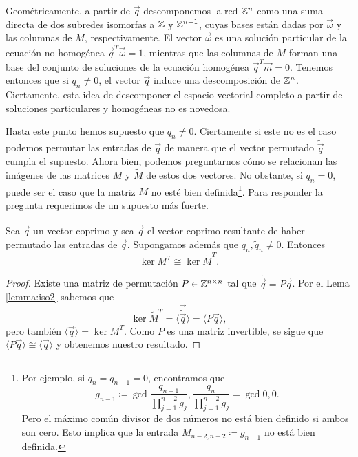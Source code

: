 Geométricamente, a partir de $\vec{q}$ descomponemos la red $\mathbb{Z}^n$ como una suma directa de dos
subredes isomorfas a $\mathbb{Z}$ y $\mathbb{Z}^{n-1}$, cuyas bases están dadas por $\vec{\omega}$ y las columnas de
$M$, respectivamente. El vector $\vec{\omega}$ es una solución particular de la ecuación no
homogénea $\vec{q}^T\vec{\omega} = 1$, mientras que las columnas de $M$ forman una base del conjunto
de soluciones de la ecuación homogénea $\vec{q}^T\vec{m} = 0$. Tenemos entonces que si $q_n \neq 0$,
el vector $\vec{q}$ induce una descomposición de $\mathbb{Z}^n$. Ciertamente, esta idea de descomponer el
espacio vectorial completo a partir de soluciones particulares y homogéneas no es novedosa.

Hasta este punto hemos supuesto que $q_n \neq 0$. Ciertamente si este no es el caso podemos
permutar las entradas de $\vec{q}$ de manera que el vector permutado $\tilde{\vec{q}}$ cumpla el
supuesto. Ahora bien, podemos preguntarnos cómo se relacionan las imágenes de las matrices $M$ y
$\tilde{M}$ de estos dos vectores. No obstante, si $q_n = 0$, puede ser el caso que la matriz
$M$ no esté bien definida\footnote{
	Por ejemplo, si $q_n = q_{n-1} = 0$, encontramos que
	\begin{equation*}
		g_{n-1} \coloneq \gcd{\frac{q_{n-1}}{\prod_{j=1}^{n-2}g_j},
		\frac{q_n}{\prod_{j=1}^{n-2}g_j}} = \gcd{0, 0}.
	\end{equation*}
	Pero el máximo común divisor de dos números no está bien definido si ambos son cero. Esto
	implica que la entrada $M_{n-2, n-2} \coloneq g_{n-1}$ no está bien definida.
}. Para responder la pregunta requerimos de un supuesto más fuerte.
\begin{corollary}
	\label{cor:iso3}
	Sea $\vec{q}$ un vector coprimo y sea $\tilde{\vec{q}}$ el vector coprimo resultante de haber
	permutado las entradas de $\vec{q}$. Supongamos además que $q_n, \tilde{q}_n \neq 0$.
	Entonces
	\begin{equation*}
		\ker{M^T} \cong \ker{\tilde{M}^T}.
	\end{equation*}
\end{corollary}
\begin{proof}
	Existe una matriz de permutación $P \in \mathbb{Z}^{n \times n}$ tal que $\tilde{\vec{q}} = P\vec{q}$.
	Por el Lema \ref{lemma:iso2} sabemos que
	\begin{equation*}
		\ker{\tilde{M}^T} = \langle \vec{\tilde{\vec{q}}} \rangle = \langle P\vec{q} \rangle,
	\end{equation*}
	pero también $\langle \vec{q} \rangle = \ker{M^T}$. Como $P$ es una matriz invertible, se sigue
	que $\langle P\vec{q} \rangle \cong \langle \vec{q} \rangle$ y obtenemos nuestro resultado.
\end{proof}
